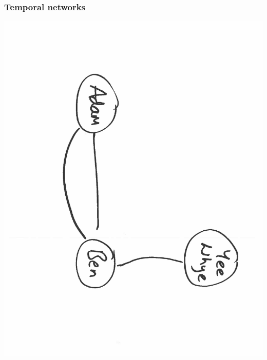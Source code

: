 \documentclass[final,hyperref={pdfpagelabels=false},noamsthm]{beamer}
\begin{document}
\begin{frame}
	\frametitle{Temporal networks}
	\includegraphics[angle=90,origin=c,scale=0.4]{fig/socialnet3}
\end{frame}
\end{document}
